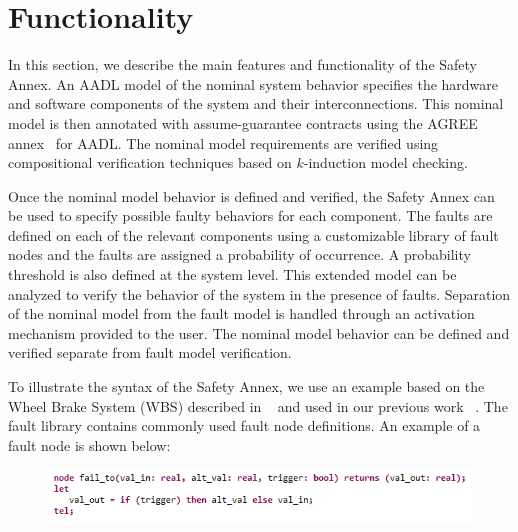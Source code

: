 \section{Functionality}
In this section, we describe the main features and functionality of the Safety Annex.
%
An AADL model of the nominal system behavior specifies the hardware and software components of the system and their interconnections. This nominal model is then annotated with assume-guarantee contracts using the AGREE annex~\cite{NFM2012:CoGaMiWhLaLu} for AADL. The nominal model  requirements are verified using compositional verification techniques based on $k$-induction model checking.

Once the nominal model behavior is defined and verified, the Safety Annex can be used to specify possible faulty behaviors for each component. The faults are defined on each of the relevant components using a customizable library of fault nodes and the faults are assigned a probability of occurrence. A probability threshold is also defined at the system level. This extended model can be analyzed to verify the behavior of the system in the presence of faults. Separation of the nominal model from the fault model is handled through an activation mechanism provided to the user. The nominal model behavior can be defined and verified separate from fault model verification.

To illustrate the syntax of the Safety Annex, we use an example based on the Wheel Brake System (WBS) described in ~\cite{AIR6110} and used in our previous work ~\cite{Stewart17:IMBSA}.
The fault library contains commonly used fault node definitions. An example of a fault node is shown below:
\begin{figure}[h!]
\vspace{-0.19in}
\begin{center}
\includegraphics[trim=0 9 0 5,clip,width=1.0\textwidth]{images/faultNode.png}
\end{center}
\vspace{-0.4in}
\end{figure}

